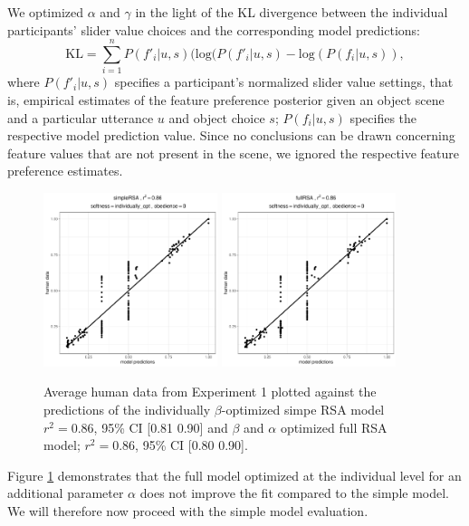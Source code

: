 \documentclass[10pt,a4paper]{article}
\begin{document}
We optimized $\alpha$ and $\gamma$ in the light of the KL divergence between the individual participants' slider value choices and the corresponding model predictions:
$$\textrm{KL} = \sum_{i=1}^{n} P(f'_i|u,s) (\textrm {log} (P(f'_i|u,s) - \textrm {log} (P(f_i|u,s)),$$
where $P(f'_i|u,s)$ specifies a participant's normalized slider value settings, that is, empirical estimates of the feature preference posterior given an object scene and a particular utterance $u$ and object choice $s$; $P(f_i|u,s)$ specifies the respective model prediction value.
Since no conclusions can be drawn concerning feature values that are not present in the scene, we ignored the respective feature preference estimates. 

\begin{figure}[ht]
	\centering
	\includegraphics[width=2in]{images/m3.pdf}
	\includegraphics[width=2in]{images/m16.pdf}
	\caption{Average human data from Experiment 1 plotted against the predictions of the individually $\beta$-optimized simpe RSA model $r^{2}=0.86$, 95\% CI [0.81 0.90] and $\beta$ and $\alpha$ optimized full RSA model; $r^{2}=0.86$, 95\% CI [0.80 0.90].}\label{simple-full-individual}
\end{figure}

Figure \ref{simple-full-individual} demonstrates that the full model optimized at the individual level for an additional parameter $\alpha$ does not improve the fit compared to the simple model. We will therefore now proceed with the simple model evaluation.
\end{document}
